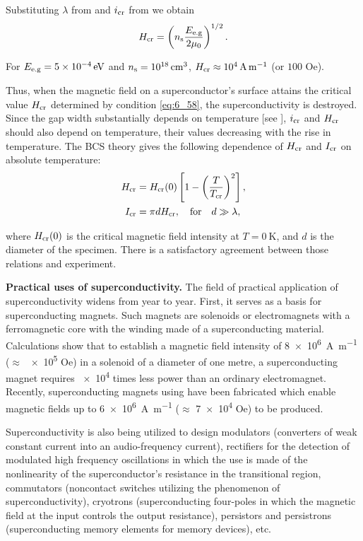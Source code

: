 \noindent
Substituting $\lambda$ from  and $i_{\text{cr}}$ from  we obtain
\begin{equation}\label{eq:6_58}
	H_{\text{cr}} = \left(n_{\text{s}} \frac{E_{\text{e.g}}}{2 \mu_0}\right)^{1/2}.
\end{equation}

\noindent
For $E_{\text{e.g}}=\SI{5e-4}{\electronvolt}$ and $n_{\text{s}}=\SI{e18}{\centi\metre\cubed}$, $H_{\text{cr}}\approx\SI{e4}{\ampere\per\metre}$ (or $100$ Oe).

Thus, when the magnetic field on a superconductor's surface attains the critical value $H_{\text{cr}}$ determined by condition \eqref{eq:6_58}, the superconductivity is destroyed. Since the gap width substantially depends on temperature [see ], $i_{\text{cr}}$ and $H_{\text{cr}}$ should also depend on temperature, their values decreasing with the rise in temperature. The BCS theory gives the following dependence of $H_{\text{cr}}$ and $I_{\text{cr}}$ on absolute temperature:
\begin{align}
	H_{\text{cr}} &= H_{\text{cr}}(0) \left[1 - \left(\frac{T}{T_{\text{cr}}}\right)^2\right], \label{eq:6_59}\\
	I_{\text{cr}} &= \pi d H_{\text{cr}},\quad \text{for}\quad d\gg\lambda, \label{eq:6_60}
\end{align}

\noindent
where $H_{\text{cr}}(0)$ is the critical magnetic field intensity at $T=\SI{0}{\kelvin}$, and $d$ is the diameter of the specimen. There is a satisfactory agreement between those relations and experiment.

\textbf{Practical uses of superconductivity.} The field of practical application of superconductivity widens from year to year. First, it serves as a basis for superconducting magnets. Such magnets are solenoids or electromagnets with a ferromagnetic core with the winding made of a superconducting material. Calculations show that to establish a magnetic field intensity of \SI{8e6}{\ampere\per\metre} ($\approx$ \num{e5} Oe) in a solenoid of a diameter of one metre, a superconducting magnet requires \num{e4} times less power than an ordinary electromagnet. Recently, superconducting magnets using  have been fabricated which enable magnetic fields up to \SI{6e6}{\ampere\per\metre} ($\approx$ \num{7e4} Oe) to be produced.

Superconductivity is also being utilized to design modulators (converters of weak constant current into an audio-frequency current), rectifiers for the detection of modulated high frequency oscillations in which the use is made of the nonlinearity of the superconductor's resistance in the transitional region, commutators (noncontact switches utilizing the phenomenon of superconductivity), cryotrons (superconducting four-poles in which the magnetic field at the input controls the output resistance), persistors and persistrons (superconducting memory elements for memory devices), etc.


